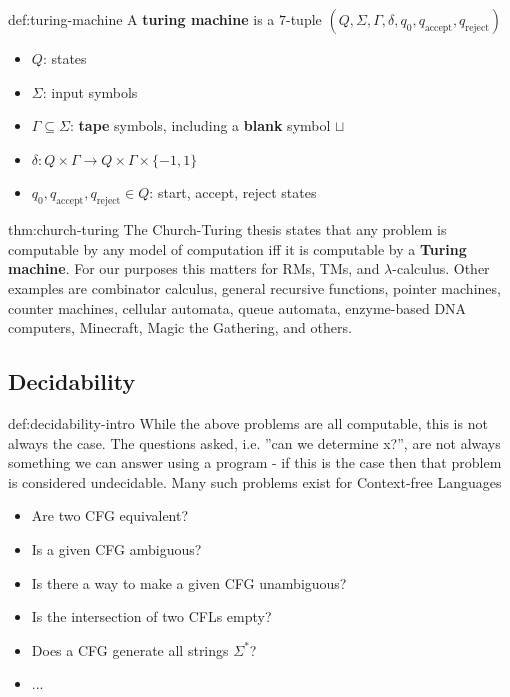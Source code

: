 \documentclass[landscape, 8pt]{extarticle}
\begin{document}
\begin{multicols}{3}
\begin{dfn}{def:turing-machine}{}
A \textbf{turing machine} is a $7$-tuple $(Q, \Sigma, \Gamma, \delta, q_{0}, q_{\text{accept}}, q_{\text{reject}})$
\renewcommand\labelitemi{\tiny$\bullet$}
\begin{itemize}
    \setlength\itemsep{0em}
    \item $Q$: states
    \item $\Sigma$: input symbols
    \item $\Gamma\subseteq\Sigma$: \textbf{tape} symbols, including a \textbf{blank} symbol $\sqcup$
    \item $\delta : Q \times \Gamma \to Q \times \Gamma \times \{-1, 1\}$
    \item $q_{0}, q_{\text{accept}}, q_{\text{reject}}\in Q$: start, accept, reject states
\end{itemize}
\end{dfn}

\begin{thm}{thm:church-turing}{}
The Church-Turing thesis states that any problem is computable by any model of computation iff it is computable by a \textbf{Turing machine}. \newline
For our purposes this matters for RMs, TMs, and $\lambda$-calculus. \newline
Other examples are combinator calculus, general recursive functions, pointer machines, counter machines, cellular automata, queue automata, enzyme-based
DNA computers, Minecraft, Magic the Gathering, and others.
\end{thm}

\subsection*{Decidability}

\begin{dfn}{def:decidability-intro}{}
While the above problems are all computable, this is not always the case. The
questions asked, i.e. ”can we determine x?”, are not always something we can
answer using a program - if this is the case then that problem is considered
undecidable.\newline
Many such problems exist for Context-free Languages
\renewcommand\labelitemi{\tiny$\bullet$}
\begin{itemize}
    \setlength\itemsep{0em}
    \item Are two CFG equivalent?
    \item Is a given CFG ambiguous?
    \item Is there a way to make a given CFG unambiguous?
    \item Is the intersection of two CFLs empty?
    \item Does a CFG generate all strings $\Sigma^{*}$?
    \item ...
\end{itemize}
\end{dfn}


\end{multicols}
\end{document}
